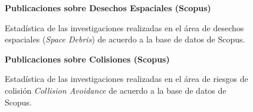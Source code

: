 \begin{figure}[!h]
\centering
  \textbf{Publicaciones sobre Desechos Espaciales (Scopus)}\par\medskip
    \caption[Desechos Espaciales seg\'un Scopus]{Estad\'istica de las investigaciones realizadas en el \'area de desechos espaciales ({\it{Space Debris}}) de acuerdo a la base de datos de Scopus.}
    \label{fig:scopusSD}
\end{figure}

\begin{figure}[!h]
\centering
   \textbf{Publicaciones sobre Colisiones (Scopus)}\par\medskip
    \caption[Riesgos de Colisi\'on seg\'un Scopus]{Estad\'istica de las investigaciones realizadas en el \'area de riesgos de colisi\'on {\it{Collision Avoidance}} de acuerdo a la base de datos de Scopus.}
    \label{fig:scopusCA}
\end{figure} 

